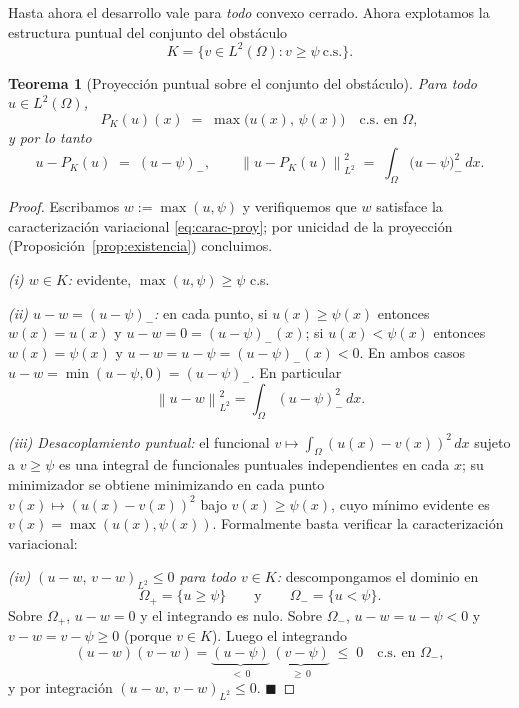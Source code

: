 \documentclass[11pt,a4paper]{article}
\newtheorem{teorema}{Teorema}[section]
\theoremstyle{definition}
\theoremstyle{remark}
\newcommand{\Norm}[1]{\left\lVert #1 \right\rVert}
\newcommand{\pk}{P_K}
\begin{document}
Hasta ahora el desarrollo vale para \emph{todo} convexo cerrado. Ahora
explotamos la estructura puntual del conjunto del obstáculo
\[
K = \bigl\{ v \in L^2(\Omega) : v \ge \psi \ \text{c.s.}\bigr\}.
\]

\begin{teorema}[Proyección puntual sobre el conjunto del obstáculo]\label{thm:proy-puntual}
Para todo $u \in L^2(\Omega)$,
\[
\pk(u)(x) \;=\; \max\bigl(u(x),\, \psi(x)\bigr) \quad \text{c.s. en } \Omega,
\]
y por lo tanto
\[
u - \pk(u) \;=\; (u - \psi)_- ,\qquad
\Norm{u - \pk(u)}_{L^2}^2 \;=\; \int_\Omega \bigl(u - \psi\bigr)_-^2\,dx .
\]
\end{teorema}

\begin{proof}
Escribamos $w := \max(u, \psi)$ y verifiquemos que $w$ satisface la
caracterización variacional \eqref{eq:carac-proy}; por unicidad de la
proyección (Proposición~\ref{prop:existencia}) concluimos.

\smallskip
\emph{(i) $w \in K$:} evidente, $\max(u,\psi) \ge \psi$ c.s.

\smallskip
\emph{(ii) $u - w = (u - \psi)_-$:} en cada punto, si $u(x) \ge \psi(x)$
entonces $w(x) = u(x)$ y $u - w = 0 = (u-\psi)_-(x)$; si $u(x) < \psi(x)$
entonces $w(x) = \psi(x)$ y $u - w = u - \psi = (u-\psi)_-(x) < 0$. En
ambos casos $u - w = \min(u - \psi, 0) = (u-\psi)_-$. En particular
\[
\Norm{u - w}_{L^2}^2 = \int_\Omega (u-\psi)_-^2\,dx .
\]

\emph{(iii) Desacoplamiento puntual:} el funcional
$v \mapsto \int_\Omega (u(x) - v(x))^2\,dx$ sujeto a $v \ge \psi$ es una
integral de funcionales puntuales independientes en cada $x$; su
minimizador se obtiene minimizando en cada punto
$v(x) \mapsto (u(x) - v(x))^2$ bajo $v(x) \ge \psi(x)$, cuyo mínimo
evidente es $v(x) = \max(u(x), \psi(x))$. Formalmente basta verificar la
caracterización variacional:

\smallskip
\emph{(iv) $(u - w,\, v - w)_{L^2} \le 0$ para todo $v \in K$:}
descompongamos el dominio en
\[
\Omega_+ = \{ u \ge \psi \}
\qquad\text{y}\qquad
\Omega_- = \{ u < \psi \}.
\]
Sobre $\Omega_+$, $u - w = 0$ y el integrando es nulo. Sobre $\Omega_-$,
$u - w = u - \psi < 0$ y $v - w = v - \psi \ge 0$ (porque $v \in K$).
Luego el integrando
\[
(u - w)(v - w) = \underbrace{(u - \psi)}_{<\,0}\,\underbrace{(v - \psi)}_{\ge\,0}
\;\le\; 0 \quad\text{c.s. en } \Omega_- ,
\]
y por integración $(u-w,\,v-w)_{L^2} \le 0$. $\blacksquare$
\end{proof}
\end{document}
